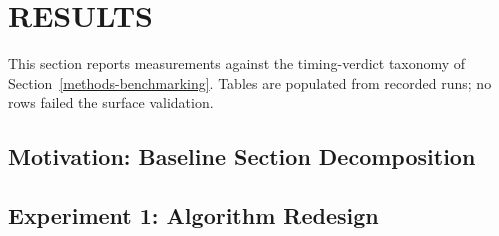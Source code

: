 \section{RESULTS}\label{results}

This section reports measurements against the timing-verdict
taxonomy of Section~\ref{methods-benchmarking}. Tables are
populated from recorded runs; no rows failed the surface validation.

\subsection{Motivation: Baseline Section
Decomposition}\label{results-motivation}

\begin{table}[H]
  \caption{Baseline section time shares (\%) of $T_{\text{grid}}$ on
           \texttt{vanilla\_baseline}. Perturb., Binding, and Batch
           eval. are timed per grid point; the remainder (collect and
           residual) is not shown.}
  \label{tab:profile}
  \centering
\end{table}

\subsection{Experiment 1: Algorithm
Redesign}\label{results-experiment-1-algorithm-redesign}

